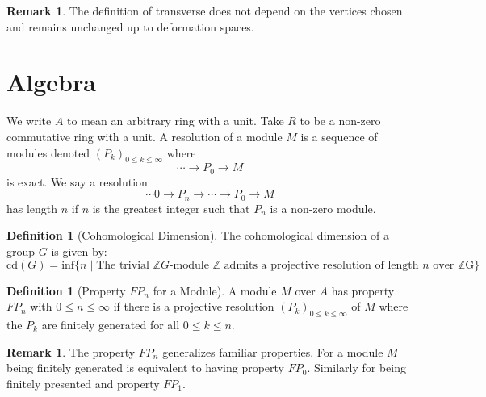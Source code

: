 \documentclass[12pt,parskip=full]{report}
\theoremstyle{plain}
\theoremstyle{definition}
\newtheorem{rmk}[thm]{Remark}
\newtheorem{dfn}[thm]{Definition}
\begin{document}
\begin{rmk}
    The definition of transverse does not depend on the vertices chosen and remains unchanged up to deformation spaces. 
\end{rmk}

\section{Algebra}

We write \(A\) to mean an arbitrary ring with a unit. Take \(R\) to be a non-zero commutative ring with a unit. A resolution of a module \(M\) is a sequence of modules denoted \((P_k)_{0\leq k\leq \infty}\) where \[\cdots \to P_0\to M\] is exact. We say a resolution \[\cdots 0\to P_n\to \cdots\to P_0 \to M\] has length \(n\) if \(n\) is the greatest integer such that \(P_n\) is a non-zero module.

\begin{dfn}
[Cohomological Dimension]
The cohomological dimension of a group \(G\) is given by:
\[
    \text{cd}(G) = \text{inf}\{n\mid\text{The trivial }\mathbb{Z}G\text{-module }\mathbb{Z}\text{ admits a projective resolution of length \(n\) over \(\mathbb{Z}\)G}\}
\]
\end{dfn}

\begin{dfn}
[Property \(FP_n\) for a Module]

A module \(M\) over \(A\) has property \(FP_n\) with \(0\leq n\leq \infty\) if there is a projective resolution \((P_k)_{0\leq k\leq \infty}\) of \(M\) where the \(P_k\) are finitely generated for all \(0\leq k\leq n\).
\end{dfn}

\begin{rmk}
The property \(FP_n\) generalizes familiar properties. For a module \(M\) being finitely generated is equivalent to having property \(FP_0\). Similarly for being finitely presented and property \(FP_1\).
\end{rmk}
\end{document}
